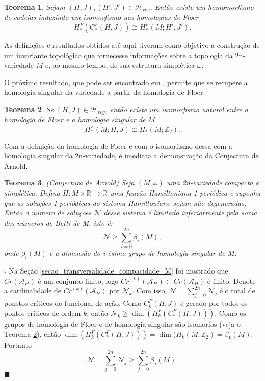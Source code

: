 \documentclass[12pt]{book}
\newtheorem{teorema}{Teorema}[section]
\newenvironment{prova}[1]{$\square$ #1}{\hfill$\blacksquare$}
\newcommand{\funcionalH}{\mathcal{A}_{H}}
\newcommand{\hamiltonianasRegulares}{\mathcal{H}_{reg}}
\newcommand{\inteiros}{\mathbb{Z}}
\newcommand{\pontoscriticos}[1]{\textit{Cr}(#1)}
\newcommand{\pontoscriticosordem}[2]{\textit{Cr}^{(#1)}(#2)}
\newcommand{\real}[1]{\mathbb{R}^{#1}}
\newcommand{\reta}{\real{}}
\begin{document}
	\begin{teorema}
		Sejam $(H,J), (H',J') \in \hamiltonianasRegulares$. Então existe um homomorfismo de cadeias induzindo um isomorfismo nas homologias de Floer
		$$
		H^{F}_{*}(C^{F}_{*}(H,J)) \cong H^{F}_{*}(M; H',J'). 
		$$
	\end{teorema}
	
	As definições e resultados obtidos até aqui tiveram como objetivo a construção de um invariante topológico que fornecesse informações sobre a topologia da 2n-variedade $M$ e, ao mesmo tempo, de sua estrutura simplética $\omega$.
	
	O próximo resultado, que pode ser encontrado em \cite{salamon_zehnder}, permite que se recupere a homologia singular da variedade a partir da homologia de Floer.
	
	\begin{teorema}\label{teorema_isomorfismo_homologia_floer}
		Se $(H,J) \in \hamiltonianasRegulares$, então 
		existe um isomorfismo natural entre a homologia de Floer e a homologia singular de $M$
		$$
		H^{F}_{*}(M;H,J) \cong H_{*}(M;\inteiros_{2}). 
		$$
		
	\end{teorema}
	
	Com a definição da homologia de Floer e com o isomorfismo dessa com a homologia singular da 2n-variedade, é imediata a demonstração da Conjectura de Arnold.
	
	\begin{teorema}
			(Conjectura de Arnold) Seja $(M,\omega)$ uma 2n-variedade compacta e simplética. Defina $H:M\times \real{} \to \reta$ uma função Hamiltoniana 1-periódica e suponha que as soluções 1-periódicas do sistema Hamiltoniano sejam não-degeneradas. Então o número de soluções $\mathcal{N}$ desse sistema é limitado inferiormente pela soma dos números de Betti de M, isto é:
				$$
				\mathcal{N}\geq \sum_{i=0}^{2n}\beta_{i}(M),
				$$
				onde $\beta_{i}(M)$ é a dimensão do i-ésimo grupo de homologia singular de $M$.
	\end{teorema}
	\begin{prova}
		Na Seção \ref{secao_transversalidade_compacidade_M} foi mostrado que $\pontoscriticos{\funcionalH}$ é um conjunto finito, logo $\pontoscriticosordem{k}{\funcionalH} \subset \pontoscriticos{\funcionalH}$ é finito. Denote a cardinalidade de $\pontoscriticosordem{k}{\funcionalH}$ por $\mathcal{N}_{k}$. Com isso, $\mathcal{N} =\sum_{j=0}^{2n} \mathcal{N}_{j}$ é o total de ponstos críticos do funcional de ação. Como $C^{F}_{k}(H,J)$ é gerado por todos os pontos críticos de ordem $k$, então $\mathcal{N}_{k}\geq \dim(	H^{F}_{k}(C^{F}_{*}(H,J)))$. Como os grupos de homologia de Floer e de homologia singular são isomorfos (veja o Teorema \ref{teorema_isomorfismo_homologia_floer}), então $\dim(	H^{F}_{k}(C^{F}_{*}(H,J)))  = \dim(	H_{k}(M;\inteiros_{2}) = \beta_{k}(M)$. Portanto
		$$
		\mathcal{N} =\sum_{j=0}^{2n} \mathcal{N}_{j} \geq \sum_{j=0}^{2n} \beta_{j}(M).
		$$ 
	\end{prova}
	
\end{document}
